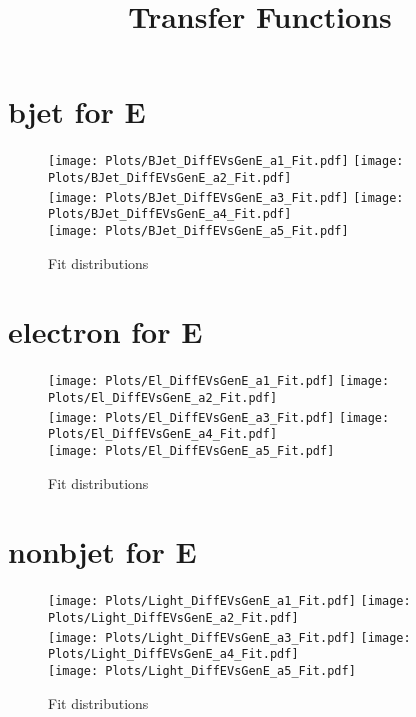 \documentclass[a4paper,10pt]{article}
\title{Transfer Functions}
\begin{document}
 
 \maketitle 

 \newpage \section{bjet for E}
\begin{figure}[h!b] 
  \texttt{[image: Plots/BJet\_DiffEVsGenE\_a1\_Fit.pdf]} 
  \texttt{[image: Plots/BJet\_DiffEVsGenE\_a2\_Fit.pdf]} \\ 
  \texttt{[image: Plots/BJet\_DiffEVsGenE\_a3\_Fit.pdf]} 
  \texttt{[image: Plots/BJet\_DiffEVsGenE\_a4\_Fit.pdf]} \\ 
  \texttt{[image: Plots/BJet\_DiffEVsGenE\_a5\_Fit.pdf]} 
\caption{Fit distributions} 
\end{figure} 

 \newpage \section{electron for E}
\begin{figure}[h!b] 
  \texttt{[image: Plots/El\_DiffEVsGenE\_a1\_Fit.pdf]} 
  \texttt{[image: Plots/El\_DiffEVsGenE\_a2\_Fit.pdf]} \\ 
  \texttt{[image: Plots/El\_DiffEVsGenE\_a3\_Fit.pdf]} 
  \texttt{[image: Plots/El\_DiffEVsGenE\_a4\_Fit.pdf]} \\ 
  \texttt{[image: Plots/El\_DiffEVsGenE\_a5\_Fit.pdf]} 
\caption{Fit distributions} 
\end{figure} 

 \newpage \section{nonbjet for E}
\begin{figure}[h!b] 
  \texttt{[image: Plots/Light\_DiffEVsGenE\_a1\_Fit.pdf]} 
  \texttt{[image: Plots/Light\_DiffEVsGenE\_a2\_Fit.pdf]} \\ 
  \texttt{[image: Plots/Light\_DiffEVsGenE\_a3\_Fit.pdf]} 
  \texttt{[image: Plots/Light\_DiffEVsGenE\_a4\_Fit.pdf]} \\ 
  \texttt{[image: Plots/Light\_DiffEVsGenE\_a5\_Fit.pdf]} 
\caption{Fit distributions} 
\end{figure} 
\end{document}
